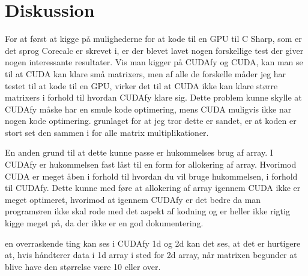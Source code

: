 \section{Diskussion}
For at først at kigge på mulighederne for at kode til en GPU til C Sharp, som er det sprog Corecalc er skrevet i, er der blevet lavet nogen forskellige test der giver nogen interessante resultater. Vis man kigger på CUDAfy og CUDA, kan man se til at CUDA kan klare små matrixers, men af alle de forskelle måder jeg har testet til at kode til en GPU, virker det til at CUDA ikke kan klare større matrixers i forhold til hvordan CUDAfy klare sig. Dette problem kunne skylle at CUDAfy måske har en smule kode optimering, mens CUDA muligvis ikke nar nogen kode optimering. grunlaget for at jeg tror dette er sandet, er at koden er stort set den sammen i for alle matrix multiplikationer.

En anden grund til at dette kunne passe er hukommelses brug af array. I CUDAfy er hukommelsen fast låst til en form for allokering af array. Hvorimod CUDA er meget åben i forhold til hvordan du vil bruge hukommelsen, i forhold til CUDAfy. Dette kunne med føre at allokering af array igennem CUDA ikke er meget optimeret, hvorimod at igennem CUDAfy er det bedre da man programøren ikke skal rode med det aspekt af kodning og er heller ikke rigtig kigge meget på, da der ikke er en god dokumentering.

en overraskende ting kan ses i CUDAfy 1d og 2d kan det ses, at det er hurtigere at, hvis håndterer data i 1d array i sted for 2d array, når matrixen begunder at blive have den størrelse være 10 eller over.